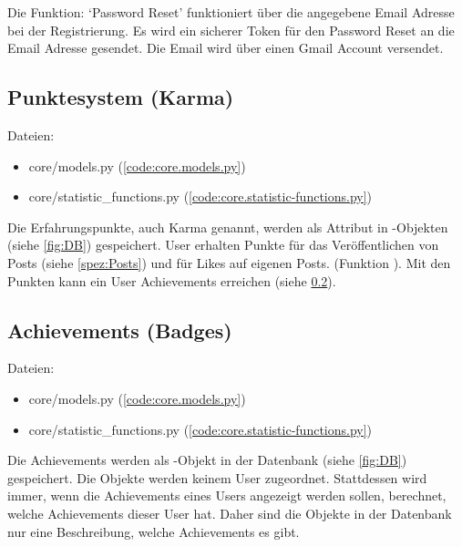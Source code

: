 Die Funktion: `Password Reset' funktioniert über die angegebene Email Adresse
bei der Registrierung. Es wird ein sicherer Token für den Password Reset an die
Email Adresse gesendet. Die Email wird über einen Gmail Account versendet.


\subsection{Punktesystem (Karma)} \label{spez:Karma}

Dateien:
\begin{itemize}
    \item core/models.py (\ref{code:core.models.py})
    \item core/statistic\_functions.py (\ref{code:core.statistic-functions.py})
\end{itemize}

Die Erfahrungspunkte, auch Karma genannt, werden als Attribut in
-Objekten (siehe \ref{fig:DB}) gespeichert. User erhalten Punkte
für das Veröffentlichen von Posts (siehe \ref{spez:Posts}) und für Likes auf
eigenen Posts. (Funktion ). Mit den Punkten kann
ein User Achievements erreichen (siehe \ref{spez:Badges}).

\subsection{Achievements (Badges)} \label{spez:Badges}

Dateien:
\begin{itemize}
    \item core/models.py (\ref{code:core.models.py})
    \item core/statistic\_functions.py (\ref{code:core.statistic-functions.py})
\end{itemize}

Die Achievements werden als -Objekt in der Datenbank (siehe
\ref{fig:DB}) gespeichert. Die Objekte werden keinem User zugeordnet.
Stattdessen wird immer, wenn die Achievements eines Users angezeigt werden
sollen, berechnet, welche Achievements dieser User hat. Daher sind die Objekte
in der Datenbank nur eine Beschreibung, welche Achievements es gibt.

